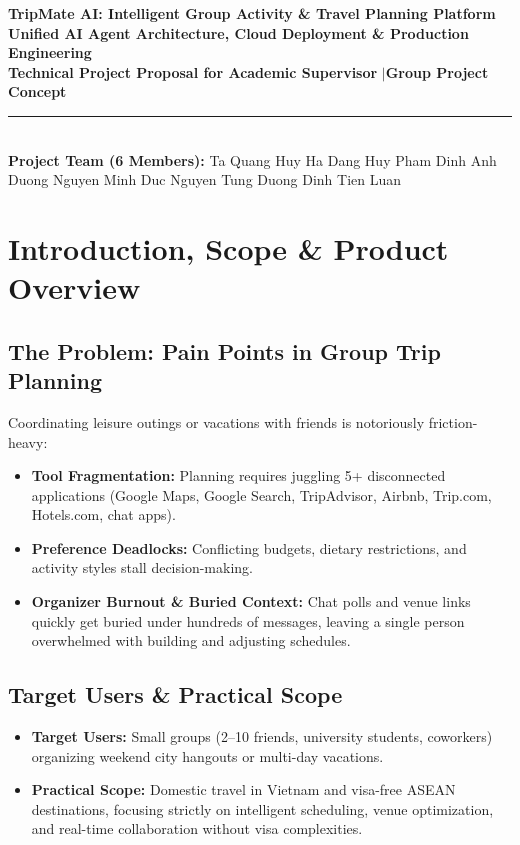 \documentclass[11pt,a4paper]{article}
\begin{document}
\begin{center}
{\LARGE\bfseries\color{primaryblue} TripMate AI: Intelligent Group Activity \& Travel Planning Platform}\\[0.10cm]
{\large\bfseries\color{accentteal} Unified AI Agent Architecture, Cloud Deployment \& Production Engineering}\\[0.14cm]
{\small\textbf{Technical Project Proposal for Academic Supervisor} \quad$\vert$\quad \textbf{Group Project Concept}}\\[0.08cm]
\rule{\textwidth}{0.8pt}\\[0.08cm]
{\footnotesize \textbf{Project Team (6 Members):} Ta Quang Huy \quad Ha Dang Huy \quad Pham Dinh Anh Duong \quad Nguyen Minh Duc \quad Nguyen Tung Duong \quad Dinh Tien Luan}
\end{center}
\vspace{-0.15cm}

\section{Introduction, Scope \& Product Overview}

\subsection{The Problem: Pain Points in Group Trip Planning}
Coordinating leisure outings or vacations with friends is notoriously friction-heavy:
\begin{itemize}
\item \textbf{Tool Fragmentation:} Planning requires juggling 5+ disconnected applications (Google Maps, Google Search, TripAdvisor, Airbnb, Trip.com, Hotels.com, chat apps).
\item \textbf{Preference Deadlocks:} Conflicting budgets, dietary restrictions, and activity styles stall decision-making.
\item \textbf{Organizer Burnout \& Buried Context:} Chat polls and venue links quickly get buried under hundreds of messages, leaving a single person overwhelmed with building and adjusting schedules.
\end{itemize}

\subsection{Target Users \& Practical Scope}
\label{sec:target_audience}
\begin{itemize}
\item \textbf{Target Users:} Small groups (2--10 friends, university students, coworkers) organizing weekend city hangouts or multi-day vacations.
\item \textbf{Practical Scope:} Domestic travel in Vietnam and visa-free ASEAN destinations, focusing strictly on intelligent scheduling, venue optimization, and real-time collaboration without visa complexities.
\end{itemize}
\end{document}
